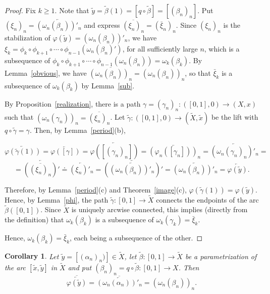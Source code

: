 \documentclass{amsart}
\newtheorem{corollary}[theorem]{Corollary}
\theoremstyle{definition}
\theoremstyle{remark}
\numberwithin{equation}{section}
\begin{document}
\begin{proof} Fix $k\geqslant 1$. Note that  $\tilde{y}=\tilde{\beta}(1)=[q\circ \tilde{\beta}]=[(\beta_n)_n]$.
Put $(\xi_n)_n=\overleftarrow{(\omega_n(\beta_n))'_n}$ and
 express $\overline{(\xi_n)_n}=(\bar{\xi}_n)_n$.
  Since $(\xi_n)_n$ is the stabilization of  $\varphi(\tilde{y})=(\omega_n(\beta_n))'_n$, we have $\xi_k=\phi_k\circ\phi_{k+1}\circ\cdots\circ\phi_{n-1}(\omega_n(\beta_n)')$, for all sufficiently large $n$, which is a subsequence of
$\phi_k\circ\phi_{k+1}\circ\cdots\circ\phi_{n-1}(\omega_n(\beta_n))=\omega_k(\beta_k)$. By Lemma~\ref{obvious}, we have $\overline{(\omega_n(\beta_n))_n}=(\omega_n(\beta_n))_n$, so that $\bar{\xi}_k$ is a subsequence of $\omega_k(\beta_k)$ by Lemma~\ref{sub}.

By Proposition~\ref{realization}, there is a path $\gamma=(\gamma_n)_n:([0,1],0)\rightarrow (X,x)$ such that $(\omega_n(\gamma_n))_n=\overline{(\xi_n)_n}$. Let $\tilde{\gamma}:([0,1],0)\rightarrow (\tilde{X},\tilde{x})$ be the lift with $q\circ \tilde{\gamma}=\gamma$. Then, by Lemma~\ref{period}(b),

\[\overleftarrow{\varphi(\tilde{\gamma}(1))}=\overleftarrow{\varphi([\gamma])}=\overleftarrow{\varphi([(\gamma_n)_n])}=\overleftarrow{(\varphi_n([\gamma_n]))_n}
=\overleftarrow{(\omega_n(\gamma_n)_n)'_n}=\] \[=\overleftarrow{\left(\overline{(\xi_n)_n}\right)'}\doteq \overleftarrow{(\xi_n)'_n}=\overleftarrow{\left(\overleftarrow{(\omega_n(\beta_n))'_n}\right)'}=\overleftarrow{(\omega_n(\beta_n))'_n}=
\overleftarrow{\varphi(\tilde{y})}.\]

Therefore, by Lemma~\ref{period}(c) and Theorem~\ref{image}(c), $\varphi(\tilde{\gamma}(1))=\varphi(\tilde{y})$. Hence, by Lemma~\ref{phi}, the path
$\tilde{\gamma}:[0,1]\rightarrow \tilde{X}$ connects the endpoints of the arc $\tilde{\beta}([0,1])$. Since $\tilde{X}$ is uniquely arcwise connected, this implies (directly from the definition) that $\omega_k(\beta_k)$ is a subsequence of $\omega_k(\gamma_k)=\bar{\xi}_k$.

Hence,  $\omega_k(\beta_k)=\bar{\xi}_k$, each being a subsequence of the other.
\end{proof}

\begin{corollary}\label{coarc}
Let $\tilde{y}=[(\alpha_n)_n)]\in \tilde{X}$, let $\tilde{\beta}:[0,1]\rightarrow \tilde{X}$ be a parametrization of the arc $[\tilde{x},\tilde{y}]$ in $\tilde{X}$ and put $(\beta_n)_n=q\circ \tilde{\beta}:[0,1]\rightarrow X$. Then
\[\overline{\overleftarrow{\varphi(\tilde{y})}}=\overline{\overleftarrow{(\omega_n(\alpha_n))'_n}}=(\omega_n(\beta_n))_n.\]
\end{corollary}
\end{document}
